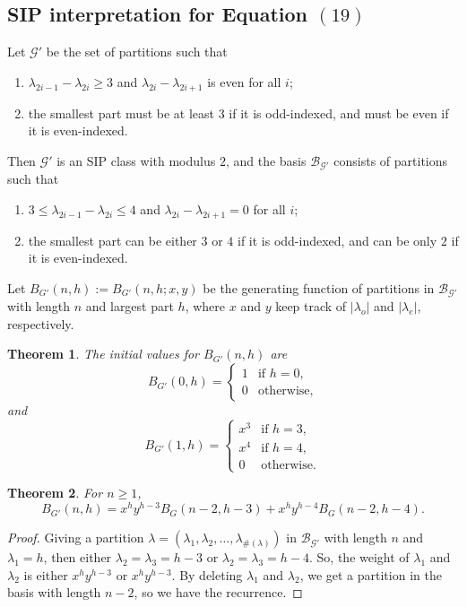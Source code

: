 \documentclass[12pt]{amsart}
\newtheorem{theorem}{Theorem}[section]
\theoremstyle{definition}
\theoremstyle{remark}
\numberwithin{equation}{section}
\begin{document}
\subsection{SIP interpretation for Equation $(19)$}

Let $\mathcal{G}'$ be the set of partitions such that
\begin{enumerate}
    \item $\lambda_{2i-1}-\lambda_{2i}\geq3$ and $\lambda_{2i}-\lambda_{2i+1}$ is even for all $i$;
    \item the smallest part must be at least $3$ if it is odd-indexed, and must be even if it is even-indexed.
\end{enumerate}
Then $\mathcal{G}'$ is an SIP class with modulus $2$, and the basis $\mathcal{B}_{\mathcal{G}'}$ consists of partitions such that
\begin{enumerate}
    \item $3\leq\lambda_{2i-1}-\lambda_{2i}\leq4$ and $\lambda_{2i}-\lambda_{2i+1}=0$ for all $i$;
    \item the smallest part can be either $3$ or $4$ if it is odd-indexed, and can be only $2$ if it is even-indexed.
\end{enumerate}
Let $B_{G'}(n,h):=B_{G'}(n,h;x,y)$ be the generating function of partitions in $\mathcal{B}_{\mathcal{G}'}$ with length $n$ and largest part $h$, where $x$ and $y$ keep track of $|\lambda_{o}|$ and $|\lambda_{e}|$, respectively.

\begin{theorem}
The initial values for $B_{G'}(n,h)$ are
\begin{equation}
B_{G'}(0,h)=\begin{cases}
    1 & \text{if $h=0$}, \\
    0 & \text{otherwise},
\end{cases}    
\end{equation}
and
\begin{equation}
B_{G'}(1,h)=\begin{cases}
    x^3 & \text{if $h=3$}, \\
    x^4 & \text{if $h=4$},\\
    0 & \text{otherwise}.
\end{cases}
\end{equation}
\end{theorem}

\begin{theorem}
For $n\geq1$,
\begin{equation}\label{eq:BG'Rec}
B_{G'}(n,h)=x^{h}y^{h-3}B_G(n-2,h-3)+x^{h}y^{h-4}B_G(n-2,h-4).
\end{equation}
\end{theorem}
\begin{proof}
Giving a partition $\lambda=(\lambda_1,\lambda_2,\ldots,\lambda_{\#(\lambda)})$ in $\mathcal{B}_{\mathcal{G}'}$ with length $n$ and $\lambda_1=h$, then either $\lambda_2=\lambda_3=h-3$ or $\lambda_2=\lambda_3=h-4$. So, the weight of $\lambda_1$ and $\lambda_2$ is either $x^hy^{h-3}$ or $x^hy^{h-3}$. By deleting $\lambda_1$ and $\lambda_2$, we get a partition in the basis with length $n-2$, so we have the recurrence.   
\end{proof}
\end{document}
